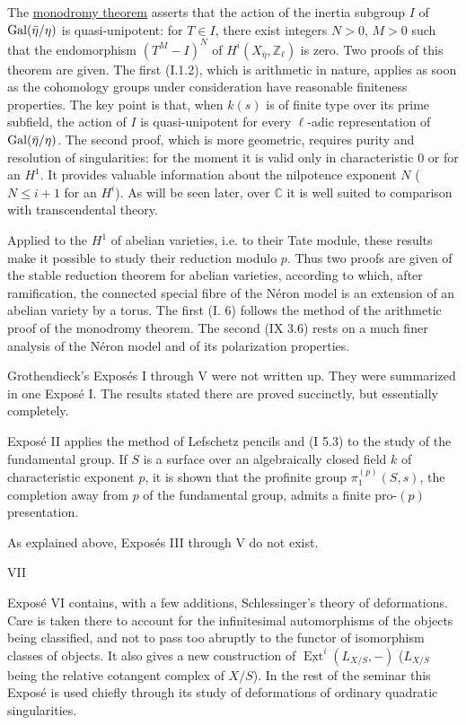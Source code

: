 The \underline{monodromy theorem} asserts that the action of the inertia
subgroup $I$ of $\operatorname{Gal}(\bar\eta/\eta)$ is quasi-unipotent: for $T\in I$, there
exist integers $N>0$, $M>0$ such that the endomorphism $(T^M-I)^N$ of
$H^i(X_{\bar\eta},\mathbb Z_\ell)$ is zero. Two proofs of this theorem are
given. The first (I.1.2), which is arithmetic in nature, applies as soon as the
cohomology groups under consideration have reasonable finiteness properties.
The key point is that, when $k(s)$ is of finite type over its prime subfield,
the action of $I$ is quasi-unipotent for every $\ell$-adic representation of
$\operatorname{Gal}(\bar\eta/\eta)$. The second proof, which is more geometric, requires
purity and resolution of singularities: for the moment it is valid only in
characteristic $0$ or for an $H^1$. It provides valuable information about the
nilpotence exponent $N$ ($N\leq i+1$ for an $H^i$). As will be seen later, over
$\mathbb C$ it is well suited to comparison with transcendental theory.

Applied to the $H^1$ of abelian varieties, i.e. to their Tate module, these
results make it possible to study their reduction modulo $p$. Thus two proofs
are given of the stable reduction theorem for abelian varieties, according to
which, after ramification, the connected special fibre of the Néron model is
an extension of an abelian variety by a torus. The first (I. 6) follows the
method of the arithmetic proof of the monodromy theorem. The second (IX 3.6)
rests on a much finer analysis of the Néron model and of its polarization
properties.

Grothendieck's Exposés I through V were not written up. They were summarized in
one Exposé I. The results stated there are proved succinctly, but essentially
completely.

Exposé II applies the method of Lefschetz pencils and (I 5.3) to the study of
the fundamental group. If $S$ is a surface over an algebraically closed field
$k$ of characteristic exponent $p$, it is shown that the profinite group
$\pi_1^{(p)}(S,s)$, the completion away from $p$ of the fundamental group,
admits a finite pro-$(p)$ presentation.

As explained above, Exposés III through V do not exist.

\clearpage
\thispagestyle{empty}
\begin{center}
VII
\end{center}

Exposé VI contains, with a few additions, Schlessinger's theory of
deformations. Care is taken there to account for the infinitesimal
automorphisms of the objects being classified, and not to pass too abruptly to
the functor of isomorphism classes of objects. It also gives a new construction
of $\underline{\operatorname{Ext}}^{i}(L_{X/S},-)$ ($L_{X/S}$ being the
relative cotangent complex of $X/S$). In the rest of the seminar this Exposé is
used chiefly through its study of deformations of ordinary quadratic
singularities.


